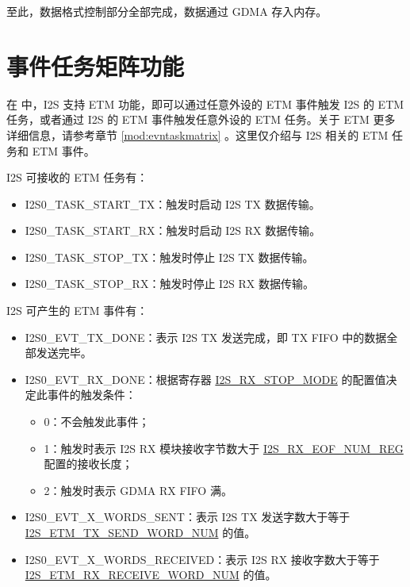 \documentclass[main\_\_CN.tex]{subfiles}
\begin{document}
至此，数据格式控制部分全部完成，数据通过 GDMA 存入内存。

\section{事件任务矩阵功能} \label{sec:i2s-etm-func}

在 \chipname{} 中，I2S 支持 ETM 功能，即可以通过任意外设的 ETM 事件触发 I2S 的 ETM 任务，或者通过 I2S 的 ETM 事件触发任意外设的 ETM 任务。关于 ETM 更多详细信息，请参考章节 \ref{mod:evntaskmatrix} 。这里仅介绍与 I2S 相关的 ETM 任务和 ETM 事件。

I2S 可接收的 ETM 任务有：

\begin{itemize}
    \item \label{task:I2STASKSTARTTX}I2S0\_TASK\_START\_TX：触发时启动 I2S TX 数据传输。
    \item \label{task:I2STASKSTARTRX}I2S0\_TASK\_START\_RX：触发时启动 I2S RX 数据传输。
    \item \label{task:I2STASKSTOPTX}I2S0\_TASK\_STOP\_TX：触发时停止 I2S TX 数据传输。
    \item \label{task:I2STASKSTOPRX}I2S0\_TASK\_STOP\_RX：触发时停止 I2S RX 数据传输。
\end{itemize}

I2S 可产生的 ETM 事件有：

\begin{itemize}
    \item \label{evt:I2SEVTTXDONE}I2S0\_EVT\_TX\_DONE：表示 I2S TX 发送完成，即 TX FIFO 中的数据全部发送完毕。
    \item \label{evt:I2SEVTRXDONE}I2S0\_EVT\_RX\_DONE：根据寄存器 \hyperref[fielddesc:I2SRXSTOPMODE]{I2S\_RX\_STOP\_MODE} 的配置值决定此事件的触发条件：
    \begin{itemize}
        \item 0：不会触发此事件；
        \item 1：触发时表示 I2S RX 模块接收字节数大于 \hyperref[regdesc:I2SRXEOFNUMREG]{I2S\_RX\_EOF\_NUM\_REG} 配置的接收长度；
        \item 2：触发时表示 GDMA RX FIFO 满。
    \end{itemize}
    \item \label{evt:I2SEVTXWORDSSENT}I2S0\_EVT\_X\_WORDS\_SENT：表示 I2S TX 发送字数大于等于 \hyperref[fielddesc:I2SETMTXSENDWORDNUM]{I2S\_ETM\_TX\_SEND\_WORD\_NUM} 的值。
    \item \label{evt:I2SEVTXWORDSRECEIVED}I2S0\_EVT\_X\_WORDS\_RECEIVED：表示 I2S RX 接收字数大于等于 \hyperref[fielddesc:I2SETMRXRECEIVEWORDNUM]{I2S\_ETM\_RX\_RECEIVE\_WORD\_NUM} 的值。
\end{itemize}
\end{document}
